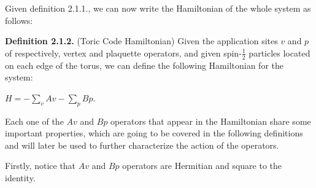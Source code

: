 \documentclass[12pt]{report}
\begin{document}
\begin{minipage}{1\textwidth}
\begin{center}
		\end{center}
		
		Given definition 2.1.1., we can now write the Hamiltonian of the whole system as follows:\newline
		
		\textbf{Definition 2.1.2.} (Toric Code Hamiltonian) Given the application sites $v$ and $p$ of  respectively, vertex and plaquette operators, and given spin-$\frac{1}{2}$ particles located on each edge of the torus, we can define the following Hamiltonian for the system:\newline
		
		\begin{center}
			
			$H = -\sum_{v} 
			Av - \sum_{p} Bp $.\newline
			
		\end{center}
		
		Each one of the $Av$ and $Bp$ operators that appear in the Hamiltonian share some important properties, which are going to be covered in the following definitions and will later be used to further characterize the action of the operators. \newline
		
		
		Firstly, notice that $Av$ and $Bp$ operators are Hermitian and square to the identity. \newline
		
	\end{minipage}  
	
\end{document}
